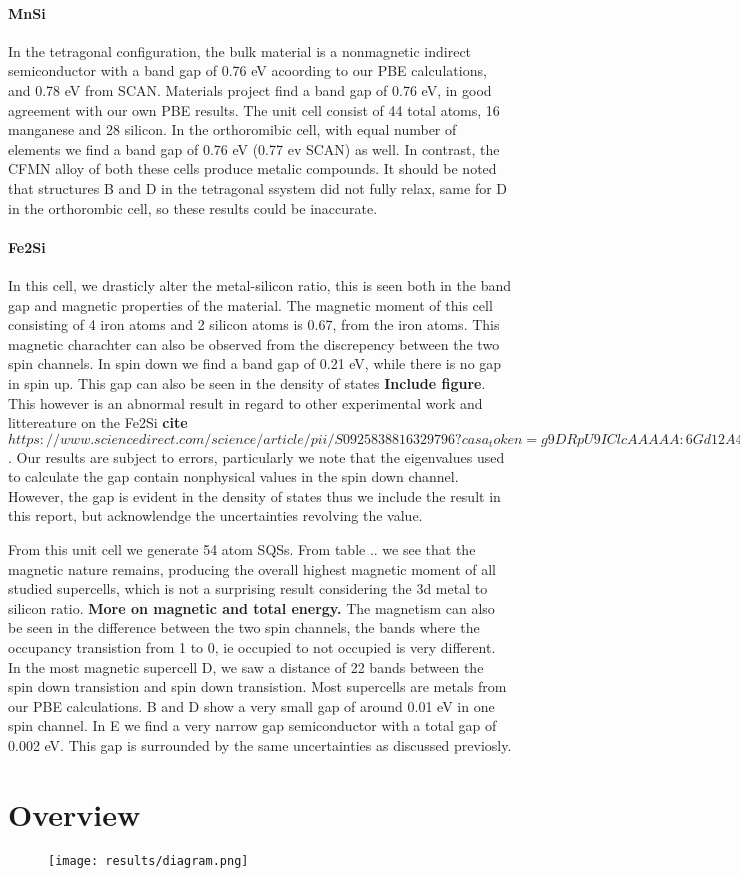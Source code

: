 \paragraph{MnSi \\}
In the tetragonal configuration, the bulk material is a nonmagnetic indirect semiconductor with a band gap of 0.76 eV acoording to our PBE calculations,  and 0.78 eV from SCAN. Materials project find a band gap of 0.76 eV, in good agreement with our own PBE results. The unit cell consist of 44 total atoms, 16 manganese and 28 silicon. In the orthoromibic cell, with equal number of elements we find a band gap of 0.76 eV (0.77 ev SCAN) as well. In contrast, the CFMN alloy of both these cells produce metalic compounds. It should be noted that structures B and D in the tetragonal ssystem did not fully relax, same for D in the orthorombic cell, so these results could be inaccurate.   

\paragraph{Fe2Si \\}
In this cell, we drasticly alter the metal-silicon ratio, this is seen both in the band gap and magnetic properties of the material. The magnetic moment of this cell consisting of 4 iron atoms and 2 silicon atoms is 0.67, from the iron atoms. This magnetic charachter can also be observed from the discrepency between the two spin channels. In spin down we find a band gap of 0.21 eV, while there is no gap in spin up. This gap can also be seen in the density of states \textbf{Include figure}. This however is an abnormal result in regard to other experimental work and littereature on the Fe2Si \textbf{cite $https://www.sciencedirect.com/science/article/pii/S0925838816329796?casa_token=g9DRpU9IClcAAAAA:6Gd12A4Kh9J2igUWMVwHN8OSIKzD27VACA052FNsSAWhRY6PELWdVEPbiF8OtQ3eJEAbvQ8X0g$}. Our results are subject to errors, particularly we note that the eigenvalues used to calculate the gap contain nonphysical values in the spin down channel. However, the gap is evident in the density of states thus we include the result in this report, but acknowlendge the uncertainties revolving the value. 

From this unit cell we generate 54 atom SQSs. From table .. we see that the magnetic nature remains, producing the overall highest magnetic moment of all studied supercells, which is not a surprising result considering the 3d metal to silicon ratio. \textbf{More on magnetic and total energy.} The magnetism can also be seen in the difference between the two spin channels, the bands where the occupancy transistion from 1 to 0, ie occupied to not occupied is very different. In the most magnetic supercell D, we saw a distance of 22 bands between the spin down transistion and spin down transistion. Most supercells are metals from our PBE calculations. B and D show a very small gap of around 0.01 eV in one spin channel.  In E we find a very narrow gap semiconductor with a total gap of 0.002 eV. This gap is surrounded by the same uncertainties as discussed previosly.  

\section{Overview}

\begin{figure}[H]
\centering
\texttt{[image: results/diagram.png]}
\end{figure}